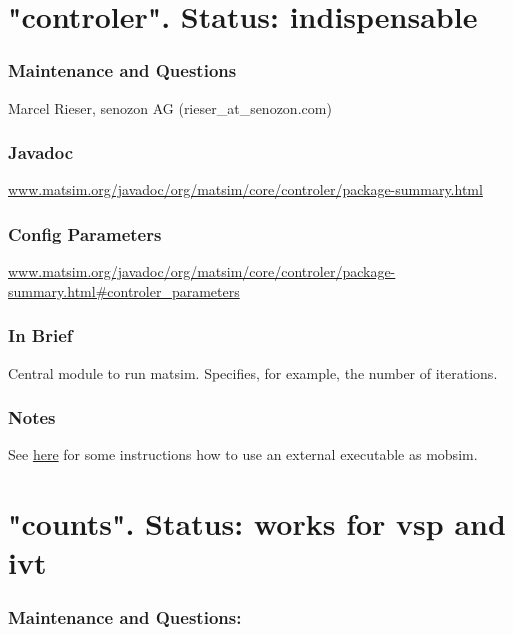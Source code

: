 \documentclass[a4paper,11pt]{report}
\begin{document}
\vfill\eject
\section{"controler". Status: indispensable}

\subsubsection{\textbf{Maintenance and Questions}}

Marcel Rieser, senozon AG (rieser\_at\_senozon.com)

\subsubsection{\textbf{Javadoc}}

\href{http://www.matsim.org/javadoc/org/matsim/core/controler/package-summary.html}{www.matsim.org/javadoc/org/matsim/core/controler/package-summary.html}



\subsubsection{Config Parameters}

\href{http://www.matsim.org/javadoc/org/matsim/core/controler/package-summary.html#controler_parameters}{www.matsim.org/javadoc/org/matsim/core/controler/package-summary.html\#controler\_parameters}


\subsubsection{\textbf{\textbf{In Brief}}}

Central module to run matsim. Specifies, for example, the number of iterations.



\subsubsection{Notes}

See \href{http://matsim.org/node/398}{here} for some instructions how to use an external executable as mobsim.

\vfill\eject
\section{"counts". Status: works for vsp and ivt}

\subsubsection{\textbf{Maintenance and Questions:}}
\end{document}
